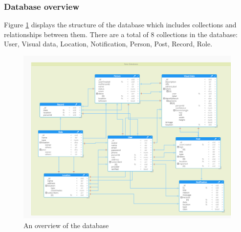 \subsubsection{Database overview}
Figure \ref{chap4:database_overview} displays the structure of the database which includes collections and relationships between them.
There are a total of 8 collections in the database: User, Visual data, Location, Notification, Person, Post, Record, Role. 
\begin{center}
	\begin{figure}[H]
		\centering
		\includegraphics[width=1\columnwidth]{images/chap4/Model.png}
		\caption{An overview of the database}
		\label{chap4:database_overview}
	\end{figure}
\end{center}
\cleardoublepage
